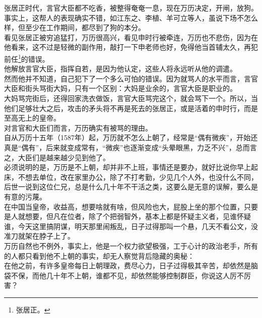\begin{multicols}{\theparacolNo}
张居正时代，言官大臣都不吃香，被整得奄奄一息，现在万历决定，开闸，放狗。\\

事实上，这帮人的表现确实不错，如江东之、李植、羊可立等人，虽说下场不怎么样，但至少在工作期间，都尽到了狗的本分。\\

看见张居正被穷追猛打，万历很高兴，看见申时行被牵连，万历也不悲伤，因为在他看来，这不过是轻微的副作用，敲打一下申老师也好，免得他当首辅太久，再犯前任\footnote{张居正。}的错误。\\

他解放言官大臣，指挥自若，是因为他认定，这些人将永远听从他的调遣。\\

然而他并不知道，自己犯下了一个多么可怕的错误。因为就骂人的水平而言，言官大臣和街头骂街大妈，只有一个区别：大妈是业余的，言官大臣是职业的。\\

大妈骂完街后，还得回家洗衣做饭，言官大臣骂完这个，就会骂下一个。所以，当他们足够壮大之后，攻击的矛头将不再是死去的张居正，或是活着的申时行，而是至高无上的皇帝。\\

对言官和大臣们而言，万历确实有被骂的理由。\\

自从万历十五年（1587年）起，万历就不怎么上朝了，经常是“偶有微疾”，开始还真是“偶有”，后来就变成常有，“微疾”也逐渐变成“头晕眼黑，力乏不兴”，总而言之，大臣们是越来越少见到他了。\\

必须说明的是，万历是不上朝，却并非不上班，事情还是要办，就好比说你早上起床，不想去单位，改在家里办公，除了不打考勤，少见几个人外，也没什么不同，后世一说到这位仁兄，总是什么几十年不干活之类，这要么是无意的误解，要么是有意的污蔑。\\

在中国当皇帝，收益高，想要啥就有啥，但风险也大，屁股上坐的那个位置，只要是人就想要，但凡在位者，除了个把弱智外，基本上都是怀疑主义者，见谁怀疑谁，今天这里搞阴谋，明天那里闹叛乱，日子过得那叫一个悬，几天不看公文，没准刀就架在脖子上了。\\

万历自然也不例外，事实上，他是一个权力欲望极强，工于心计的政治老手，所有的人都只看到他不上朝的事实，却无人察觉背后隐藏的奥秘：\\

在他之前，有许多皇帝每日上朝理政，费尽心力，日子过得极其辛苦，却依然是脑袋不保，而他几十年不上朝，谁都不见，却依然能够控制群臣，你说这人厉不厉害？\\


\end{multicols}
